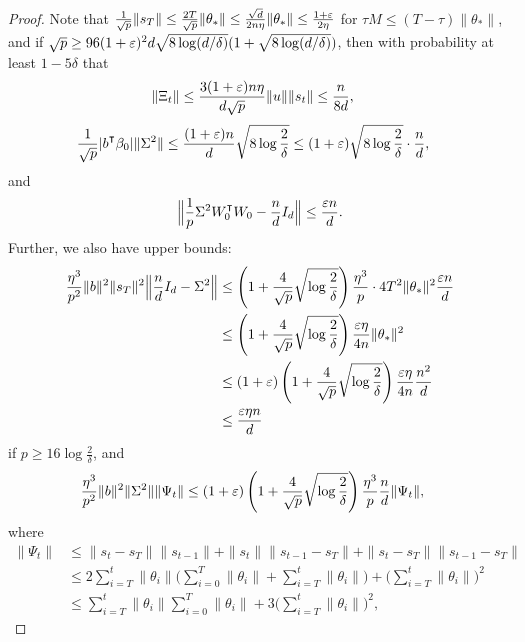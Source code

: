 \begin{proof}
    Note that $\frac{1}{\sqrt{p}} \|s_T\|\leq \frac{2T}{\sqrt{p}} \|\theta_*\| \leq \frac{\sqrt{d}}{2n\eta} \|\theta_*\| \leq \frac{1+\varepsilon}{2\eta}$ for $\tau M \leq (T-\tau) \|\theta_*\|$, and if $\sqrt{p}\geq 96(1+\varepsilon)^2 d\sqrt{8\log(d/\delta)}(1 + \sqrt{8\log(d/\delta)})$, then with probability at least $1-5\delta$ that
    \begin{align*}
        \|\Xi_t\| & \leq \frac{3(1+\varepsilon)n\eta}{d\sqrt{p}} \|u\|\|s_t\| \leq \frac{n}{8d},
    \end{align*}
    \begin{align*}
        \frac{1}{\sqrt{p}}|b\transpose\beta_0| \|\Sigma^2\| & \leq \frac{(1+\eps)n}{d}\sqrt{8\log\frac{2}{\delta}} \leq (1+\eps)\sqrt{8\log\frac{2}{\delta}} \cdot \frac{n}{d},
    \end{align*}
    and
    \begin{align*}
        \Big\| \frac{1}{p}\Sigma^2 W_0\transpose W_0 - \frac{n}{d} I_d \Big\| \leq \frac{\eps n}{d}.
    \end{align*}
    Further, we also have upper bounds:
    \begin{align*}
        \frac{\eta^3}{p^2} \|b\|^2 \|s_T\|^2 \Big\| \frac{n}{d}I_d - \Sigma^2 \Big\| & \leq \left(1 + \frac{4}{\sqrt p}\sqrt{\log\frac{2}{\delta}}\right) \frac{\eta^3}{p}\cdot 4T^2 \|\theta_*\|^2 \frac{\varepsilon n}{d} \\
        & \leq \left(1 + \frac{4}{\sqrt p}\sqrt{\log\frac{2}{\delta}}\right) \frac{\varepsilon\eta}{4n} \|\theta_*\|^2 \\
        & \leq (1+\varepsilon) \left(1 + \frac{4}{\sqrt p}\sqrt{\log\frac{2}{\delta}}\right) \frac{\varepsilon\eta}{4n}\frac{n^2}{d} \\
        & \leq \frac{\varepsilon\eta n}{d}
    \end{align*}
    if $p \geq 16\log\frac{2}{\delta}$, and
    \begin{align*}
        \frac{\eta^3}{p^2} \|b\|^2 \|\Sigma^2\| \|\Psi_t\| & \leq (1+\varepsilon) \left(1 + \frac{4}{\sqrt p}\sqrt{\log\frac{2}{\delta}}\right) \frac{\eta^3}{p} \frac{n}{d} \|\Psi_t\|,
    \end{align*}
    where 
    \begin{align*}
        \|\Psi_t\| & \leq \|s_t - s_T\| \|s_{t-1}\| + \|s_t\| \|s_{t-1} - s_T\| + \|s_t - s_T\|\|s_{t-1} - s_T\| \\
        & \leq 2\sum_{i=T}^t \|\theta_i\| \Big( \sum_{i=0}^T \|\theta_i\| + \sum_{i=T}^t \|\theta_i\| \Big) + \Big( \sum_{i=T}^t \|\theta_i\| \Big)^2 \\
        & \leq \sum_{i=T}^t \|\theta_i\| \sum_{i=0}^T \|\theta_i\| + 3\Big( \sum_{i=T}^t \|\theta_i\| \Big)^2,

\end{align*}
\end{proof}
